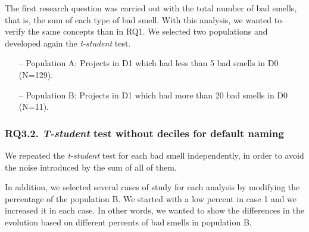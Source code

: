 The first research question was carried out with the total number of bad smells, that is, the sum of each type of bad smell. With this analysis, we wanted to verify the same concepts than in RQ1. We selected two populations and developed again the \textit{t-student} test.

\begin{itemize}
    \item[--] Population A: Projects in D1 which had less than 5 bad smells in D0 (N=129).
    \item[--] Population B: Projects in D1 which had more than 20 bad smells in D0 (N=11).
\end{itemize}


\subsubsection{RQ3.2. \textit{T-student} test without deciles for default naming}
\label{subsubsec:RQ3_2_statistical}

We repeated the \textit{t-student} test for each bad smell independently, in order to avoid the noise introduced by the sum of all of them.

In addition, we selected several cases of study for each analysis by modifying the percentage of the population B. We started with a low percent in case 1 and we increased it in each case. In other words, we wanted to show the differences in the evolution based on different percents of bad smells in population B.

